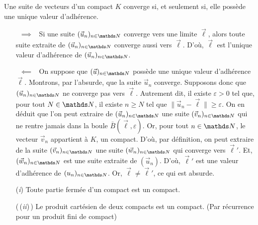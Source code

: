 \begin{prop}
	Une suite de vecteurs d'un compact $K$ converge si, et seulement si, elle possède une unique valeur d'adhérence.
\end{prop}

\begin{prv}
	\begin{itemize}
		\item[\guillemotleft~$\implies$~\guillemotright]
			Si une suite $(\vec{u}_n)_{n\in\N}$ converge vers une limite $\vec{\ell}$, alors toute suite extraite de $(\vec{u}_n)_{n \in \N}$ converge aussi vers $\vec{\ell}$.
			D'où, $\vec{\ell}$ est l'unique valeur d'adhérence de $(\vec{u}_n)_{n\in\N}$.
		\item[\guillemotleft~$\impliedby$~\guillemotright]
			On suppose que $(\vec{u})_{n \in \N}$ possède une unique valeur d'adhérence $\vec{\ell}$. Montrons, par l'absurde, que la suite $\vec{u}_n$ converge.
			Supposons donc que $(\vec{u}_n)_{n \in \N}$ ne converge pas vers $\vec{\ell}$.
			Autrement dit, il existe $\varepsilon > 0$ tel que, pour tout $N \in \N$, il existe $n \ge N$ tel que $\|\vec{u}_n - \vec{\ell}\| \ge \varepsilon$.
			On en déduit que l'on peut extraire de $(\vec{u}_n)_{n \in \N}$ une suite $(\vec{v}_n)_{n \in \N}$ qui ne rentre jamais dans la boule $\bar{B}(\vec{\ell},\varepsilon)$.
			Or, pour tout $n \in \N$, le vecteur $\vec{v}_{n}$ appartient à $K$, un compact.
			D'où, par définition, on peut extraire de la suite $(\vec{v}_n)_{n \in \N}$ une suite $(\vec{w}_n)_{n \in \N}$ qui converge vers $\vec{\ell}'$.
			Et, $(\vec{w}_n)_{n \in \N}$ est une suite extraite de $(\vec{u}_n)$.
			D'où, $\vec{\ell}'$ est une valeur d'adhérence de $(u_n)_{n\in\N}$. Or, $\vec{\ell} \neq \vec{\ell}'$, ce qui est absurde.
	\end{itemize}
\end{prv}

\begin{lem}
	\begin{enumerate}
		\item[(\textit{i})] Toute partie fermée d'un compact est un compact.
		\item[(\!\,\!(\textit{ii})\!\,\!)] Le produit cartésien de deux compacts est un compact. (Par récurrence pour un produit fini de compact)
	\end{enumerate}
\end{lem}

